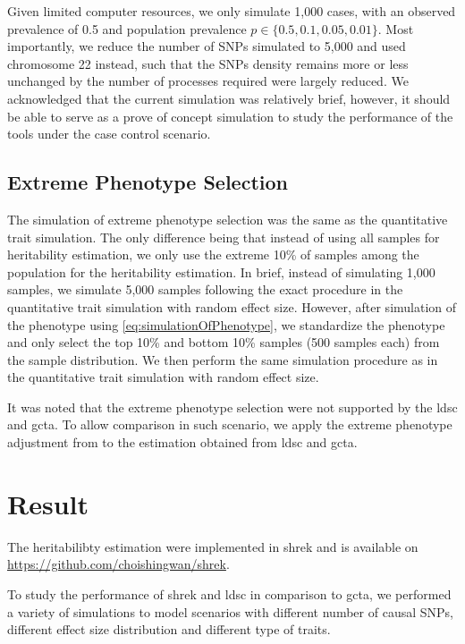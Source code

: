 		Given limited computer resources, we only simulate 1,000 cases, with an observed prevalence of 0.5 and population prevalence $p\in\{0.5, 0.1, 0.05, 0.01\}$.
		Most importantly, we reduce the number of \glspl{SNP} simulated to 5,000 and used chromosome 22 instead, such that the \glspl{SNP} density remains more or less unchanged by the number of processes required were largely reduced.
		We acknowledged that the current simulation was relatively brief, however, it should be able to serve as a prove of concept simulation to study the performance of the tools under the case control scenario.
		
		\subsection{Extreme Phenotype Selection}
		The simulation of extreme phenotype selection was the same as the quantitative trait simulation. 
		The only difference being that instead of using all samples for heritability estimation, we only use the extreme 10\% of samples among the population for the heritability estimation.
		In brief, instead of simulating 1,000 samples, we simulate 5,000 samples following the exact procedure in the quantitative trait simulation with random effect size.
		However, after simulation of the phenotype using \cref{eq:simulationOfPhenotype}, we standardize the phenotype and only select the top 10\% and bottom 10\% samples (500 samples each) from the sample distribution.
		We then perform the same simulation procedure as in the quantitative trait simulation with random effect size.
		
		It was noted that the extreme phenotype selection were not supported by the \gls{ldsc} and \gls{gcta}.
		To allow comparison in such scenario, we apply the extreme phenotype adjustment from \citet{Sham2014} to the estimation obtained from \gls{ldsc} and \gls{gcta}.
		
	\section{Result}
		The heritabilibty estimation were implemented in \gls{shrek} and is available on \url{https://github.com/choishingwan/shrek}.  
		
		To study the performance of \gls{shrek} and \gls{ldsc} in comparison to \gls{gcta}, we performed a variety of simulations to model scenarios with different number of causal \glspl{SNP}, different effect size distribution and different type of traits. 
		
